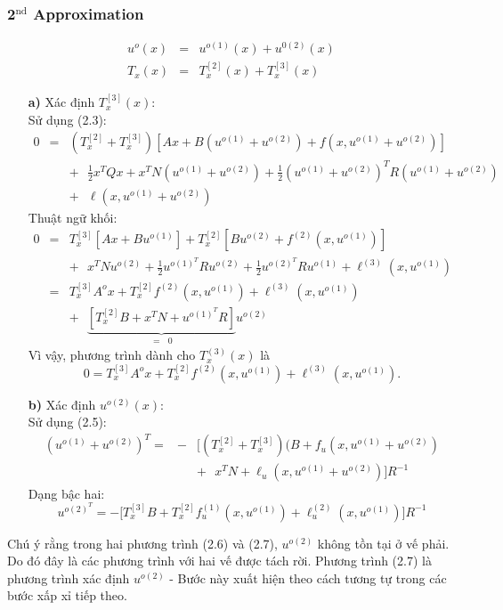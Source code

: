 \documentclass[12pt,a4paper]{report}
\begin{document}
\subsubsection{2$^\text{nd}$ Approximation}
\begin{eqnarray}
	u^o(x) &=& u^{o(1)}(x) + u^{0(2)}(x)\nonumber \\ T_x(x) &=& T_x^{[2]}(x) + T_x^{[3]}(x) \nonumber
\end{eqnarray}
\begin{itemize}
	\item[\textbf{a)}] Xác định $T_x^{[3]}(x)$: \\ Sử dụng (2.3): \begin{eqnarray}
		0 &=& (T_x^{[2]} + T_x^{[3]})[Ax + B(u^{o(1)} + u^{o(2)}) + f(x, u^{o(1)} + u^{o(2)})] \nonumber \\ && + \text{ } \frac{1}{2}x^TQx + x^TN(u^{o(1)} + u^{o(2)}) + \frac{1}{2}(u^{o(1)} + u^{o(2)})^TR(u^{o(1)} + u^{o(2)}) \nonumber \\ && +\text{ } \ell(x, u^{o(1)} + u^{o(2)}) \nonumber
	\end{eqnarray} Thuật ngữ khối: \begin{eqnarray}
		0 &=& T_x^{[3]}[Ax+Bu^{o(1)}] + T_x^{[2]}[Bu^{o(2)}+f^{(2)}(x, u^{o(1)})] \nonumber \\ && + \text{ } x^TNu^{o(2)} + \frac{1}{2}u^{o(1)^T}Ru^{o(2)} + \frac{1}{2}u^{o(2)^T}Ru^{o(1)} + \ell^{(3)}(x, u^{o(1)}) \nonumber \\ &=& T_x^{[3]}A^ox + T_x^{[2]}f^{(2)}(x, u^{o(1)}) + \ell^{(3)}(x, u^{o(1)}) \nonumber \\ && + \text{ } \underbrace{[T_x^{[2]}B + x^TN + u^{o(1)^T}R]}_{= \text{ } 0}u^{o(2)} \nonumber
	\end{eqnarray}
	 Vì vậy, phương trình dành cho $T_x^{(3)}(x)$ là \begin{equation}
	 	0 = T_x^{[3]}A^ox + T_x^{[2]}f^{(2)}(x, u^{o(1)}) + \ell^{(3)}(x, u^{o(1)}).
	 \end{equation}
\item[\textbf{b)}] Xác định $u^{o(2)}(x)$:\\
Sử dụng (2.5): \begin{eqnarray}
	(u^{o(1)} + u^{o(2)})^T = &-& \Big[(T_x^{[2]} + T_x^{[3]})(B+f_u(x, u^{o(1)} + u^{o(2)}) \nonumber \\ && + \text{ } x^TN + \ell_u(x, u^{o(1)} + u^{o(2)})\Big]R^{-1} \nonumber
\end{eqnarray}
Dạng bậc hai: \begin{equation}
	u^{o(2)^T} = - \Big[T_x^{[3]}B + T_x^{[2]}f_u^{(1)}(x, u^{o(1)}) + \ell_u^{(2)}(x, u^{o(1)})\Big]R^{-1}
\end{equation}
\end{itemize}
Chú ý rằng trong hai phương trình (2.6) và (2.7), $u^{o(2)}$ không tồn tại ở vế phải. Do đó đây là các phương trình với hai vế được tách rời. Phương trình (2.7) là phương trình xác định $u^{o(2)}$ - Bước này xuất hiện theo cách tương tự trong các bước xấp xỉ tiếp theo. 
\end{document}
